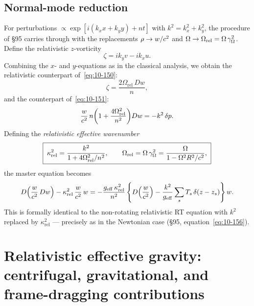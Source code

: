 \subsection{Normal-mode reduction}

For perturbations $\propto \exp[i(k_{x}x+k_{y}y)+nt]$ with
$k^{2}=k_{x}^{2}+k_{y}^{2}$, the procedure of \S95 carries through
with the replacements $\rho\to w/c^{2}$ and
$\Omega\to\Omega_{\mathrm{rel}}=\Omega\,\gamma_{\Omega}^{2}$.
Define the relativistic $z$-vorticity
\begin{equation}
  \zeta = ik_{y}v - ik_{x}u.
  \label{eq:rel95-vort}
\end{equation}
Combining the $x$- and $y$-equations as in the classical analysis, we
obtain the relativistic counterpart of~\eqref{eq:10-150}:
\begin{equation}
  \zeta = \frac{2\Omega_{\mathrm{rel}}\,Dw}{n},
  \label{eq:rel95-zeta}
\end{equation}
and the counterpart of~\eqref{eq:10-151}:
\begin{equation}
  \frac{w}{c^{2}}\,n\!
  \left(1+\frac{4\Omega_{\mathrm{rel}}^{2}}{n^{2}}\right)\!Dw
    = -k^{2}\,\delta p.
  \label{eq:rel95-press}
\end{equation}
Defining the \emph{relativistic effective wavenumber}
\begin{equation}
  \boxed{\;
  \kappa_{\mathrm{rel}}^{2}
    = \frac{k^{2}}{1 + 4\Omega_{\mathrm{rel}}^{2}/n^{2}},
  \qquad
  \Omega_{\mathrm{rel}} = \Omega\,\gamma_{\Omega}^{2}
    = \frac{\Omega}{1-\Omega^{2}R^{2}/c^{2}},\;}
  \label{eq:rel95-kappa}
\end{equation}
the master equation becomes
\begin{equation}
  D\!\left(\frac{w}{c^{2}}\,Dw\right)
    - \kappa_{\mathrm{rel}}^{2}\,\frac{w}{c^{2}}\,w
    = -\frac{g_{\mathrm{eff}}\,\kappa_{\mathrm{rel}}^{2}}{n^{2}}
      \left\{D\!\left(\frac{w}{c^{2}}\right)
        - \frac{k^{2}}{g_{\mathrm{eff}}}\sum_{s}T_{s}\,
          \delta(z-z_{s})\right\}w.
  \label{eq:rel95-master}
\end{equation}
This is formally identical to the non-rotating relativistic RT equation
with $k^{2}$ replaced by $\kappa_{\mathrm{rel}}^{2}$ --- precisely
as in the Newtonian case (\S95, equation~\eqref{eq:10-156}).

\section{Relativistic effective gravity: centrifugal, gravitational,
  and frame-dragging contributions}
\label{sec:rel-95-geff}

